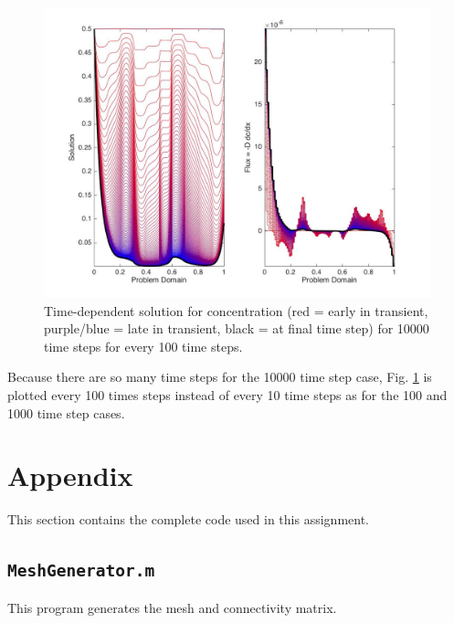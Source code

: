 \documentclass[10pt]{article}
\begin{document}
\begin{figure}[H]
  \centering
  \includegraphics[width=16cm]{10000_100.jpg}
  \caption{Time-dependent solution for concentration (red = early in transient, purple/blue = late in transient, black = at final time step) for 10000 time steps for every 100 time steps.}
    \label{fig:10000}
\end{figure}

Because there are so many time steps for the 10000 time step case, Fig. \ref{fig:10000} is plotted every 100 times steps instead of every 10 time steps as for the 100 and 1000 time step cases.

\section{Appendix}

This section contains the complete code used in this assignment. 

\subsection{\texttt{MeshGenerator.m}}
This program generates the mesh and connectivity matrix.

\end{document}
